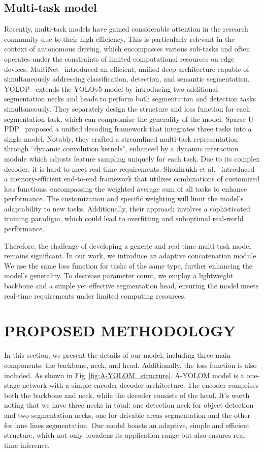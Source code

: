 \documentclass[lettersize,journal]{IEEEtran}
\begin{document}
\subsection{Multi-task model}
Recently, multi-task models have gained considerable attention in the research community due to their high efficiency. This is particularly relevant in the context of autonomous driving, which encompasses various sub-tasks and often operates under the constraints of limited computational resources on edge devices. MultiNet~\cite{teichmann2018multinet} introduced an efficient, unified deep architecture capable of simultaneously addressing classification, detection, and semantic segmentation. YOLOP~\cite{wu2022yolop} extends the YOLOv5 model by introducing two additional segmentation necks and heads to perform both segmentation and detection tasks simultaneously. They separately design the structure and loss function for each segmentation task, which can compromise the generality of the model. Sparse U-PDP~\cite{wang2023sparse} proposed a unified decoding framework that integrates three tasks into a single model. Notably, they crafted a streamlined multi-task representation through ``dynamic convolution kernels", enhanced by a dynamic interaction module which adjusts feature sampling uniquely for each task. Due to its complex decoder, it is hard to meet real-time requirements. Shokhrukh et al.~\cite{miraliev2023real} introduced a memory-efficient end-to-end framework that utilizes combinations of customized loss functions, encompassing the weighted average sum of all tasks to enhance performance. The customization and specific weighting will limit the model's adaptability to new tasks. Additionally, their approach involves a sophisticated training paradigm, which could lead to overfitting and suboptimal real-world performance.

Therefore, the challenge of developing a generic and real-time multi-task model remains significant. In our work, we introduce an adaptive concatenation module. We use the same loss function for tasks of the same type, further enhancing the model's generality. To decrease parameter count, we employ a lightweight backbone and a simple yet effective segmentation head, ensuring the model meets real-time requirements under limited computing resources.

\section{PROPOSED METHODOLOGY}
\label{sec: PROPOSED METHODOLOGY}
In this section, we present the details of our model, including three main components: the backbone, neck, and head. Additionally, the loss function is also included. As shown in Fig~\ref{fig:A-YOLOM_structure}. A-YOLOM model is a one-stage network with a simple encoder-decoder architecture. The encoder comprises both the backbone and neck, while the decoder consists of the head. It's worth noting that we have three necks in total: one detection neck for object detection and two segmentation necks, one for drivable areas segmentation and the other for lane lines segmentation. Our model boasts an adaptive, simple and efficient structure, which not only broadens its application range but also ensures real-time inference. 
\end{document}
